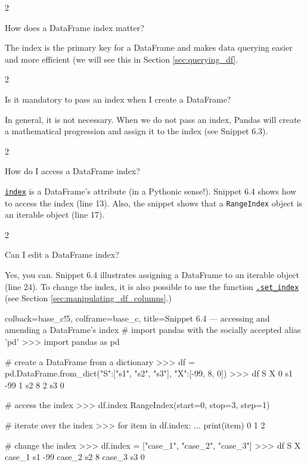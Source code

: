\documentclass[a4paper,11pt]{book}
\newcommand{\question}[1]{%
    \begin{tcolorbox}[colback=comp_c!10,colframe=comp_c,sidebyside align=top,width=\linewidth,before skip=1ex]
        #1
    \end{tcolorbox}
    \switchcolumn%
}
\newcommand{\note}[1]{%
    \begin{tcolorbox}[colback=white!0,colframe=white!10,width=\linewidth,before skip=1ex]
        #1
    \end{tcolorbox}
}
\begin{document}
\begin{paracol}{2}
	\question{\raggedright How does a DataFrame index matter?}
	\note{The index is the primary key for a DataFrame and makes data querying easier and more efficient (we will see this in Section \ref{sec:querying_df}.}
\end{paracol}
\clearpage

\begin{paracol}{2}
	\question{\raggedright Is it mandatory to pass an index when I create a DataFrame?}
	\note{In general, it is not necessary. When we do not pass an index, Pandas will create a mathematical progression and assign it to the index (see Snippet 6.3).}
\end{paracol}

\begin{paracol}{2}
	\question{\raggedright How do I access a DataFrame index?}
	\note{\href{https://pandas.pydata.org/docs/reference/api/pandas.DataFrame.index.html}{\texttt{index}} is a DataFrame's attribute (in a Pythonic sense!). Snippet 6.4 shows how to access the index (line 13). Also, the snippet shows that a \texttt{RangeIndex} object is an iterable object (line 17).}
\end{paracol}

\begin{paracol}{2}
	\question{\raggedright Can I edit a DataFrame index?}
	\note{Yes, you can. Snippet 6.4 illustrates assigning a DataFrame to an iterable object (line 24). To change the index, it is also possible to use the function \href{https://pandas.pydata.org/docs/reference/api/pandas.DataFrame.set_index.html}{\texttt{.set\_index}} (see Section \ref{sec:manipulating_df_columns}.)}
\end{paracol}

\begin{pythoncode}[linenos=True]{colback=base_c!5, colframe=base_c, title=\sffamily Snippet 6.4 --- accessing and amending a DataFrame's index}
# import pandas with the socially accepted alias 'pd'
>>> import pandas as pd

# create a DataFrame from a dictionary
>>> df = pd.DataFrame.from_dict({"S":["s1", "s2", "s3"], "X":[-99, 8, 0]})
>>> df
    S   X
0  s1 -99
1  s2   8
2  s3   0

# access the index
>>> df.index
RangeIndex(start=0, stop=3, step=1)

# iterate over the index
>>> for item in df.index:
...     print(item)
0
1
2

# change the index
>>> df.index = ["case_1", "case_2", "case_3"]
>>> df
         S   X
case_1  s1 -99
case_2  s2   8
case_3  s3   0
\end{pythoncode}
\clearpage
\end{document}
